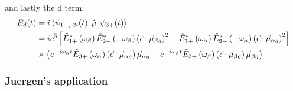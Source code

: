 and lastly the d term:
\begin{align*}
	E_d (t) &=  i \bra{\psi_{\text{1+, 2-}} (t)} \hat{\mu} \ket{\psi_{\text{3+}} (t)} \\
	&= ic^3 \left[ \tilde{E}^*_{1+} \left( \omega_{\beta} \right) \tilde{E}^*_{2-} \left( -\omega_{\beta} \right) \left( \vec{\epsilon} \cdot \vec{\mu}_{\beta g} \right)^2 + \tilde{E}^*_{1+} \left( \omega_{\alpha} \right) \tilde{E}^*_{2-} \left( -\omega_{\alpha} \right) \left( \vec{\epsilon} \cdot \vec{\mu}_{\alpha g} \right)^2 \right]  \\
	&\times \left( e^{-i \omega_{\alpha} t }\tilde{E}_{3+} \left( \omega_{\alpha} \right) \left( \vec{\epsilon} \cdot \vec{\mu}_{\alpha g} \right) \vec{\mu}_{\alpha g}+ e^{-i \omega_{\beta} t }\tilde{E}_{3+} \left( \omega_{\beta} \right) \left( \vec{\epsilon} \cdot \vec{\mu}_{\beta g} \right) \vec{\mu}_{\beta g}  \right)
\end{align*}





\subsubsection{Juergen's application}


